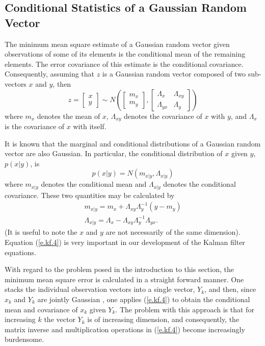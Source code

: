 \subsection{Conditional Statistics of a Gaussian Random Vector}

	The minimum mean square estimate of a
Gaussian random vector given observations of some of its
elements is the conditional mean of the remaining elements.
The error covariance of this estimate is the conditional covariance.
Consequently, assuming that $z$ is a Gaussian random vector 
composed of two sub-vectors $x$ and $y$, then
%
\begin{equation}
z=\left[\begin{array}{c}x\\y\end{array}\right]
\sim
  N\left(\left[\begin{array}{c}m_x\\m_y\end{array}\right],
  \left[\begin{array}{cc}\Lambda_{x}&\Lambda_{xy}\\
  \Lambda_{yx}&\Lambda_{y}\end{array}
   \right]\right)
\label{e.kf.2}
\end{equation}
%
where $m_x$ denotes the mean of $x$, $\Lambda_{xy}$ denotes the 
covariance of $x$ with $y$, and $\Lambda_x$ is the covariance of $x$
with itself.

	It is known that the marginal and conditional distributions
of a Gaussian random vector are also Gaussian.  In particular,
the conditional distribution of $x$ given $y$, $p(x|y)$, is
%
\begin{equation}
p(x|y)=N(m_{x|y},\Lambda_{x|y})
\label{e.kf.3}
\end{equation}
%
where $m_{x|y}$ denotes the conditional mean and $\Lambda_{x|y}$
denotes the conditional covariance.  These two quantities may be
calculated by
%
\begin{eqnarray}
m_{x|y}=m_x+\Lambda_{xy}\Lambda_y^{-1}(y-m_y)\nonumber\\
\Lambda_{x|y}=\Lambda_x-\Lambda_{xy}\Lambda_y^{-1}\Lambda_{yx}.
\label{e.kf.4}
\end{eqnarray}
%
(It is useful to note the $x$ and $y$ are not necessarily of
the same dimension).  Equation (\ref{e.kf.4}) is very important 
in our development of the Kalman filter equations.

	With regard to the problem posed in the introduction
to this section, the minimum mean square error is
calculated in a straight forward manner.  One stacks the
individual observation vectors into a single vector, $Y_k$, and then,
since $x_k$ and $Y_k$ are jointly Gaussian , one applies 
(\ref{e.kf.4}) to obtain the conditional mean and covariance
of $x_k$ given $Y_k$.  The problem with this approach is that for 
increasing $k$ the vector $Y_k$ is of increasing dimension, and 
consequently, the matrix inverse and multiplication operations in 
(\ref{e.kf.4}) become increasingly burdensome.

